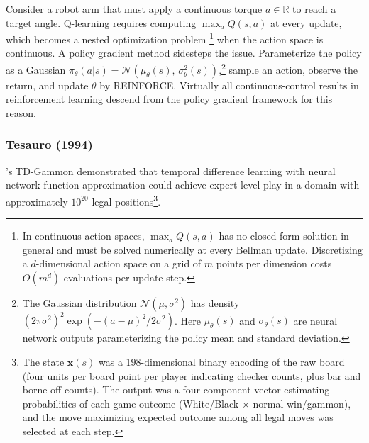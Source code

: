 Consider a robot arm that must apply a continuous torque $a \in \mathbb{R}$ to reach a target angle. Q-learning requires computing $\max_a Q(s,a)$ at every update, which becomes a nested optimization problem \footnote{In continuous action spaces, $\max_a Q(s,a)$ has no closed-form solution in general and must be solved numerically at every Bellman update. Discretizing a $d$-dimensional action space on a grid of $m$ points per dimension costs $O(m^d)$ evaluations per update step.} when the action space is continuous. A policy gradient method sidesteps the issue. Parameterize the policy as a Gaussian $\pi_\theta(a|s) = \mathcal{N}(\mu_\theta(s),\, \sigma_\theta^2(s))$,\footnote{The Gaussian distribution $\mathcal{N}(\mu, \sigma^2)$ has density $(2\pi\sigma^2)^{2}\exp(-(a-\mu)^2/2\sigma^2)$. Here $\mu_\theta(s)$ and $\sigma_\theta(s)$ are neural network outputs parameterizing the policy mean and standard deviation.} sample an action, observe the return, and update $\theta$ by REINFORCE. Virtually all continuous-control results in reinforcement learning descend from the policy gradient framework for this reason.


\subsubsection{Tesauro (1994)}

\citet{tesauro1994}'s TD-Gammon demonstrated that temporal difference learning with neural network function approximation could achieve expert-level play in a domain with approximately $10^{20}$ legal positions\footnote{The state $\mathbf{x}(s)$ was a 198-dimensional binary encoding of the raw board (four units per board point per player indicating checker counts, plus bar and borne-off counts). The output was a four-component vector estimating probabilities of each game outcome (White/Black $\times$ normal win/gammon), and the move maximizing expected outcome among all legal moves was selected at each step.}. 

